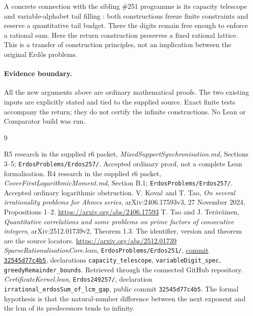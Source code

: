 \documentclass[11pt,a4paper]{article}
\theoremstyle{definition}\newtheorem{definition}[theorem]{Definition}
\theoremstyle{remark}\newtheorem{remark}[theorem]{Remark}
\begin{document}
A concrete connection with the sibling \#251 programme is its capacity telescope and variable-alphabet tail filling \cite{core251}: both constructions freeze finite constraints and reserve a quantitative tail budget. There the digits remain free enough to enforce a rational sum. Here the return construction preserves a fixed rational lattice. This is a transfer of construction principles, not an implication between the original Erd\H{o}s problems.

\paragraph{Evidence boundary.}
All the new arguments above are ordinary mathematical proofs. The two existing inputs are explicitly stated and tied to the supplied source. Exact finite tests accompany the return; they do not certify the infinite constructions. No Lean or Comparator build was run.

\begin{thebibliography}{9}\footnotesize\raggedright\setlength{\itemsep}{2pt}
 R5 research in the supplied r6 packet, \emph{MixedSupportSynchronisation.md}, Sections 3--5; \texttt{ErdosProblems/Erdos257/}. Accepted ordinary proof, not a complete Lean formalisation.
 R4 research in the supplied r6 packet, \emph{CoverFirstLogarithmicMoment.md}, Section B.1; \texttt{ErdosProblems/Erdos257/}. Accepted ordinary logarithmic obstruction.
 V. Kova\v{c} and T. Tao, \emph{On several irrationality problems for Ahmes series}, arXiv:2406.17593v3, 27 November 2024, Propositions 1--2. \url{https://arxiv.org/abs/2406.17593}
 T. Tao and J. Ter\"av\"ainen, \emph{Quantitative correlations and some problems on prime factors of consecutive integers}, arXiv:2512.01739v2, Theorem 1.3. The identifier, version and theorem are the source locators. \url{https://arxiv.org/abs/2512.01739}
 \emph{SparseRationalisationCore.lean}, \texttt{ErdosProblems/Erdos251/}, \href{https://github.com/wcook04/plectis-erdos/blob/32545d77c4b5cfd72ebd36c8dcd2418bf7cc4d31/ErdosProblems/Erdos251/SparseRationalisationCore.lean}{commit \texttt{32545d77c4b5}}, declarations \texttt{capacity\_telescope}, \texttt{variableDigit\_spec}, \texttt{greedyRemainder\_bounds}. Retrieved through the connected GitHub repository.
 \emph{CertificateKernel.lean}, \texttt{Erdos249257/}, declaration
\texttt{irrational\_erdosSum\_of\_lcm\_gap}, public commit \texttt{32545d77c4b5}.
The formal hypothesis is that the natural-number difference between the
next exponent and the lcm of its predecessors tends to infinity.
\end{thebibliography}
\end{document}
